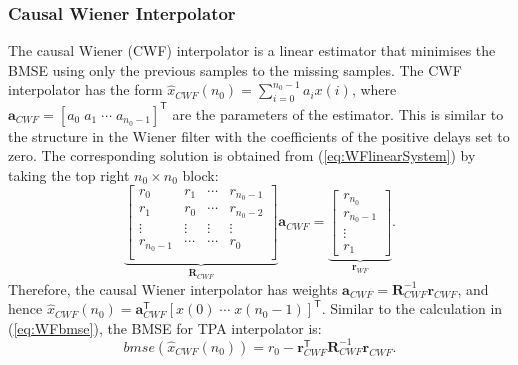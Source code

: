 \documentclass[11pt]{article}
\newcommand{\br}{\mathbf{r}}
\newcommand{\ba}{\mathbf{a}}
\newcommand{\bR}{\mathbf{R}}
\newcommand{\TT}{\mathsf{T}}
\begin{document}

\subsubsection*{Causal Wiener Interpolator}
\label{subsubsec:causalwiener}

The causal Wiener (CWF) interpolator is a linear estimator that minimises the BMSE using only the previous samples to the missing samples. The CWF interpolator has the form $\hat{x}_{CWF}(n_{0}) = \sum_{i=0}^{n_{0}-1} a_{i} x(i)$, where $\ba_{CWF} = [a_{0} \; a_{1} \; \cdots \; a_{n_{0}-1}]^{\TT}$ are the parameters of the estimator. This is similar to the structure in the Wiener filter with the coefficients of the positive delays set to zero. The corresponding solution is obtained from (\ref{eq:WFlinearSystem}) by taking the top right $n_{0} \times n_{0}$ block:
\begin{equation}
	\underbrace{\begin{bmatrix}
		r_{0} & r_{1} & \cdots & r_{n_{0}-1} \\
		r_{1} & r_{0} & \cdots & r_{n_{0}-2} \\
		\vdots & \vdots & \vdots & \vdots \\
		r_{n_{0}-1} & \cdots & \cdots & r_{0} \\
	\end{bmatrix}}_{\mathbf{R}_{CWF}} \ba_{CWF} = 
	\underbrace{\begin{bmatrix}
		r_{n_{0}} \\ r_{n_{0}-1} \\ \vdots \\ r_{1}
	\end{bmatrix}}_{\mathbf{r}_{WF}}.
\label{eq:WFlinearSystem}
\end{equation}
Therefore, the causal Wiener interpolator has weights $\ba_{CWF} = \bR_{CWF}^{-1}\br_{CWF}$, and hence $\hat{x}_{CWF}(n_{0}) = \ba_{CWF}^{\TT} [x(0) \; \cdots \; x(n_{0}-1)]^{\TT}$. Similar to the calculation in (\ref{eq:WFbmse}), the BMSE for TPA interpolator is:
\begin{equation}
	bmse(\hat{x}_{CWF}(n_{0})) = r_{0} - \br_{CWF}^{\TT} \bR_{CWF}^{-1} \br_{CWF}.
\label{eq:CWFbmse}
\end{equation}

\end{document}
